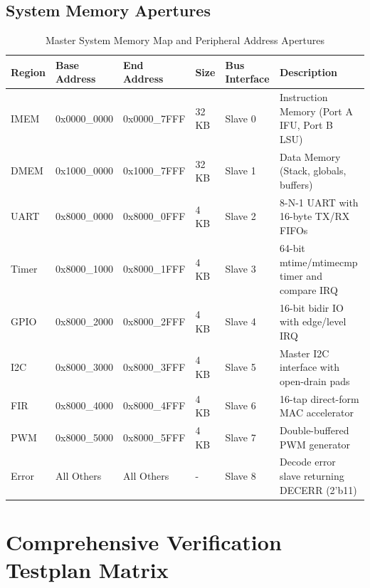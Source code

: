 \documentclass[12pt,a4paper,oneside]{report}
\begin{document}
\section{System Memory Apertures}
\begin{table}[htbp]
\centering
\caption{Master System Memory Map and Peripheral Address Apertures}
\small
\begin{tabularx}{\textwidth}{lllllX}
\toprule
\textbf{Region} & \textbf{Base Address} & \textbf{End Address} & \textbf{Size} & \textbf{Bus Interface} & \textbf{Description} \\
\midrule
IMEM & 0x0000\_0000 & 0x0000\_7FFF & 32 KB & Slave 0 & Instruction Memory (Port A IFU, Port B LSU) \\
DMEM & 0x1000\_0000 & 0x1000\_7FFF & 32 KB & Slave 1 & Data Memory (Stack, globals, buffers) \\
UART & 0x8000\_0000 & 0x8000\_0FFF & 4 KB & Slave 2 & 8-N-1 UART with 16-byte TX/RX FIFOs \\
Timer & 0x8000\_1000 & 0x8000\_1FFF & 4 KB & Slave 3 & 64-bit mtime/mtimecmp timer and compare IRQ \\
GPIO & 0x8000\_2000 & 0x8000\_2FFF & 4 KB & Slave 4 & 16-bit bidir IO with edge/level IRQ \\
I2C & 0x8000\_3000 & 0x8000\_3FFF & 4 KB & Slave 5 & Master I2C interface with open-drain pads \\
FIR & 0x8000\_4000 & 0x8000\_4FFF & 4 KB & Slave 6 & 16-tap direct-form MAC accelerator \\
PWM & 0x8000\_5000 & 0x8000\_5FFF & 4 KB & Slave 7 & Double-buffered PWM generator \\
Error & All Others & All Others & - & Slave 8 & Decode error slave returning DECERR (2'b11) \\
\bottomrule
\end{tabularx}
\end{table}

\chapter{Comprehensive Verification Testplan Matrix}
\end{document}
